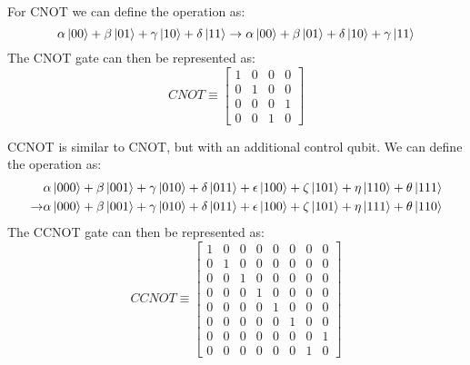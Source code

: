 \documentclass[reqno]{amsart}
\numberwithin{equation}{section}
\numberwithin{figure}{section}
\begin{document}
\begin{justify}
For CNOT we can define the operation as:
    \begin{equation}
        \alpha\ket{00} + \beta\ket{01} + \gamma\ket{10} + \delta\ket{11} \rightarrow \alpha\ket{00} + \beta\ket{01} + \delta\ket{10} + \gamma\ket{11}
    \end{equation}
The CNOT gate can then be represented as:
    \begin{equation}
        CNOT \equiv \begin{bmatrix}
                    1 & 0 & 0 & 0 \\
                    0 & 1 & 0 & 0 \\
                    0 & 0 & 0 & 1 \\
                    0 & 0 & 1 & 0
                \end{bmatrix}
    \end{equation}

CCNOT is similar to CNOT, but with an additional control qubit. We can define the operation as:
    \begin{equation}
        \begin{split}
            &\alpha\ket{000} + \beta\ket{001} + \gamma\ket{010} + \delta\ket{011} + \epsilon\ket{100} + \zeta\ket{101} + \eta\ket{110} + \theta\ket{111} \\ \rightarrow
            &\alpha\ket{000} + \beta\ket{001} + \gamma\ket{010} + \delta\ket{011} + \epsilon\ket{100} + \zeta\ket{101} + \eta\ket{111} + \theta\ket{110}
        \end{split}
    \end{equation}
The CCNOT gate can then be represented as:
    \begin{equation}
        CCNOT \equiv \begin{bmatrix}
                    1 & 0 & 0 & 0 & 0 & 0 & 0 & 0 \\
                    0 & 1 & 0 & 0 & 0 & 0 & 0 & 0 \\
                    0 & 0 & 1 & 0 & 0 & 0 & 0 & 0 \\
                    0 & 0 & 0 & 1 & 0 & 0 & 0 & 0 \\
                    0 & 0 & 0 & 0 & 1 & 0 & 0 & 0 \\
                    0 & 0 & 0 & 0 & 0 & 1 & 0 & 0 \\
                    0 & 0 & 0 & 0 & 0 & 0 & 0 & 1 \\
                    0 & 0 & 0 & 0 & 0 & 0 & 1 & 0
                \end{bmatrix}
    \end{equation}


\end{justify}
\end{document}
